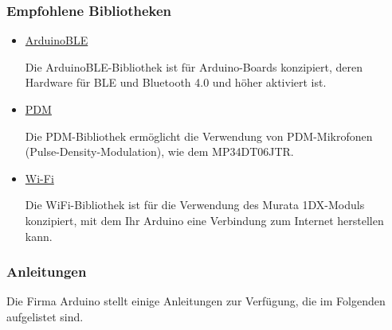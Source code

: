 \subsubsection{Empfohlene Bibliotheken}


\begin{itemize}
	\item  
	\href{https://www.arduino.cc/reference/en/libraries/arduinoble/}{ArduinoBLE}
	
	Die ArduinoBLE-Bibliothek ist für Arduino-Boards konzipiert, deren Hardware für BLE und Bluetooth 4.0 und höher aktiviert ist.
	
	\item \href{https://docs.arduino.cc/learn/built-in-libraries/pdm}{PDM}
	
	Die PDM-Bibliothek ermöglicht die Verwendung von PDM-Mikrofonen (Pulse-Density-Modulation), wie dem MP34DT06JTR.
	
	\item \href{https://www.arduino.cc/reference/en/libraries/wifi/}{Wi-Fi}
	
	Die WiFi-Bibliothek ist für die Verwendung des Murata 1DX-Moduls konzipiert, mit dem Ihr Arduino eine Verbindung zum Internet herstellen kann.
\end{itemize}


\subsubsection{Anleitungen}

Die Firma Arduino stellt einige Anleitungen zur Verfügung, die im Folgenden aufgelistet sind.

